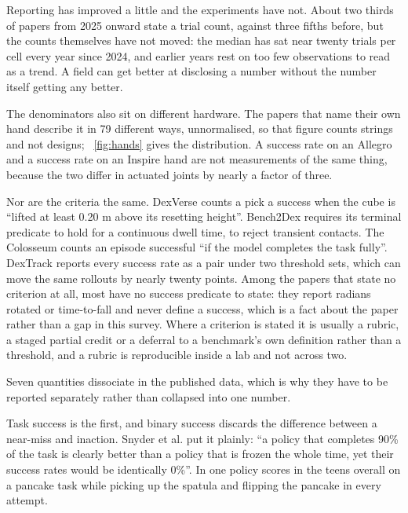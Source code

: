 Reporting has improved a little and the experiments have not. About two thirds of papers from
2025 onward state a trial count, against three fifths before, but the counts themselves have
not moved: the median has sat near twenty trials per cell every year since 2024, and earlier
years rest on too few observations to read as a trend. A field can get better at disclosing a
number without the number itself getting any better.

The denominators also sit on different hardware. The papers that name their own hand describe it
in 79 different ways, unnormalised, so that figure counts strings and not designs;
\figurename~\ref{fig:hands} gives the distribution. A success rate on an Allegro and a success
rate on an Inspire hand are not measurements of the same thing, because the two differ in actuated
joints by nearly a factor of three.

Nor are the criteria the same. DexVerse \cite{dexverse_2026} counts a pick a success when the
cube is ``lifted at least 0.20 m above its resetting height''. Bench2Dex \cite{bench2dex_2026}
requires its terminal predicate to hold for a continuous dwell time, to reject transient contacts.
The Colosseum \cite{colosseum_2024} counts an episode successful ``if the model completes the task
fully''. DexTrack \cite{dextrack_2025} reports every success rate as a pair under two threshold
sets, which can move the same rollouts by nearly twenty points. Among the papers that state no
criterion at all, most have no success predicate to state: they report radians rotated or
time-to-fall and never define a success, which is a fact about the paper rather than a gap in this
survey. Where a criterion is stated it is usually a rubric, a staged partial credit or a deferral
to a benchmark's own definition rather than a threshold, and a rubric is reproducible inside a lab
and not across two.

\label{subsec:axes}
Seven quantities dissociate in the published data, which is why they have to be reported
separately rather than collapsed into one number.

Task success is the first, and binary success discards the difference between a near-miss and
inaction. Snyder et al. \cite{beyond_binary_success_2026} put it plainly: ``a policy that completes
90\% of the task is clearly better than a policy that is frozen the whole time, yet their success
rates would be identically 0\%''. In \cite{kress_gazit_policy_eval_2024} one policy scores in the
teens overall on a pancake task while picking up the spatula and flipping the pancake in every
attempt.

